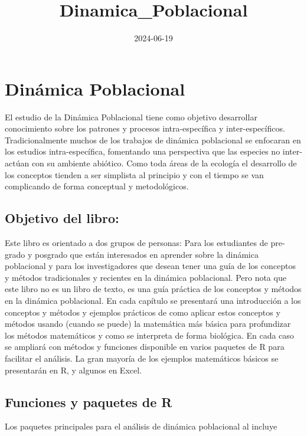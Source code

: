 \documentclass[
]{book}
\title{Dinamica\_Poblacional}
\author{}
\date{\vspace{-2.5em}2024-06-19}
\theoremstyle{definition}
\theoremstyle{definition}
\theoremstyle{definition}
\theoremstyle{definition}
\theoremstyle{remark}
\begin{document}
\maketitle

{
\setcounter{tocdepth}{1}
\tableofcontents
}
\chapter{Dinámica Poblacional}\label{dinuxe1mica-poblacional}

El estudio de la Dinámica Poblacional tiene como objetivo desarrollar conocimiento sobre los patrones y procesos intra-específica y inter-específicos. Tradicionalmente muchos de los trabajos de dinámica poblacional se enfocaran en los estudios intra-específica, fomentando una perspectiva que las especies no inter-actúan con su ambiente abiótico. Como toda áreas de la ecología el desarrollo de los conceptos tienden a ser simplista al principio y con el tiempo se van complicando de forma conceptual y metodológicos.

\section{Objetivo del libro:}\label{objetivo-del-libro}

Este libro es orientado a dos grupos de personas: Para los estudiantes de pre-grado y posgrado que están interesados en aprender sobre la dinámica poblacional y para los investigadores que desean tener una guía de los conceptos y métodos tradicionales y recientes en la dinámica poblacional. Pero nota que este libro no es un libro de texto, es una guía práctica de los conceptos y métodos en la dinámica poblacional. En cada capítulo se presentará una introducción a los conceptos y métodos y ejemplos prácticos de como aplicar estos conceptos y métodos usando (cuando se puede) la matemática más básica para profundizar los métodos matemáticos y como se interpreta de forma biológica. En cada caso se ampliará con métodos y funciones disponible en varios paquetes de R para facilitar el análisis. La gran mayoría de los ejemplos matemáticos básicos se presentarán en R, y algunos en Excel.

\section{Funciones y paquetes de R}\label{funciones-y-paquetes-de-r}

Los paquetes principales para el análisis de dinámica poblacional al incluye
\end{document}
